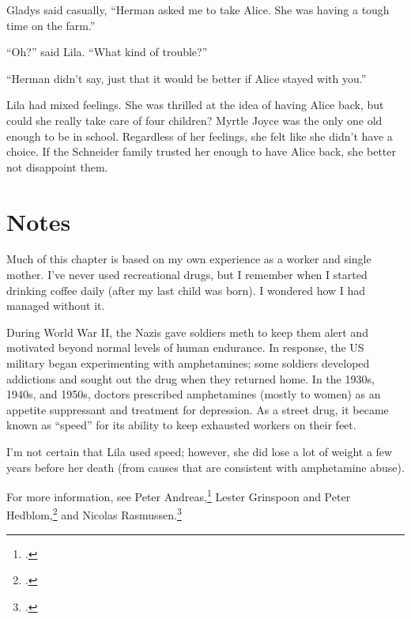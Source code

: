 \documentclass[
  american,
  letterpaper,
]{book}
\begin{document}
Gladys said casually, ``Herman asked me to take Alice. She was having a
tough time on the farm.''

``Oh?'' said Lila. ``What kind of trouble?''

``Herman didn't say, just that it would be better if Alice stayed with
you.''

Lila had mixed feelings. She was thrilled at the idea of having Alice
back, but could she really take care of four children? Myrtle Joyce was
the only one old enough to be in school. Regardless of her feelings, she
felt like she didn't have a choice. If the Schneider family trusted her
enough to have Alice back, she better not disappoint them.

\section{Notes}\label{notes-54}

Much of this chapter is based on my own experience as a worker and
single mother. I've never used recreational drugs, but I remember when I
started drinking coffee daily (after my last child was born). I wondered
how I had managed without it.

During World War II, the Nazis gave soldiers meth to keep them alert and
motivated beyond normal levels of human endurance. In response, the US
military began experimenting with amphetamines; some soldiers developed
addictions and sought out the drug when they returned home. In the
1930s, 1940s, and 1950s, doctors prescribed amphetamines (mostly to
women) as an appetite suppressant and treatment for depression. As a
street drug, it became known as ``speed'' for its ability to keep
exhausted workers on their feet.

I'm not certain that Lila used speed; however, she did lose a lot of
weight a few years before her death (from causes that are consistent
with amphetamine abuse).

For more information, see Peter Andreas,\footnote{.}
Lester Grinspoon and Peter Hedblom,\footnote{.} and Nicolas Rasmussen.\footnote{.}
\end{document}
